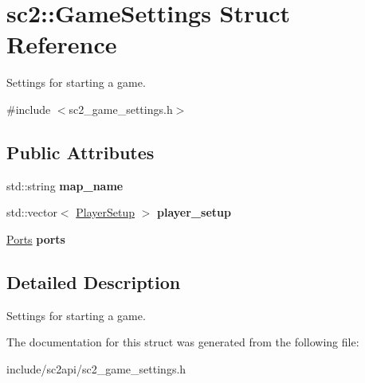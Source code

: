 \hypertarget{structsc2_1_1_game_settings}{}\section{sc2\+:\+:Game\+Settings Struct Reference}
\label{structsc2_1_1_game_settings}


Settings for starting a game.  




{\ttfamily \#include $<$sc2\+\_\+game\+\_\+settings.\+h$>$}

\subsection*{Public Attributes}
\begin{DoxyCompactItemize}
\item 
\mbox{\label{structsc2_1_1_game_settings_ab826b246ac2a8dceffc362c6d52b718a}} 
std\+::string {\bfseries map\+\_\+name}
\item 
\mbox{\label{structsc2_1_1_game_settings_a6f4043f10d2b48569d6c2139d0908d97}} 
std\+::vector$<$ \hyperlink{structsc2_1_1_player_setup}{Player\+Setup} $>$ {\bfseries player\+\_\+setup}
\item 
\mbox{\label{structsc2_1_1_game_settings_a2c8f4ffc691e9ff2db133bf1b7f89569}} 
\hyperlink{structsc2_1_1_ports}{Ports} {\bfseries ports}
\end{DoxyCompactItemize}


\subsection{Detailed Description}
Settings for starting a game. 

The documentation for this struct was generated from the following file\+:\begin{DoxyCompactItemize}
\item 
include/sc2api/sc2\+\_\+game\+\_\+settings.\+h\end{DoxyCompactItemize}
